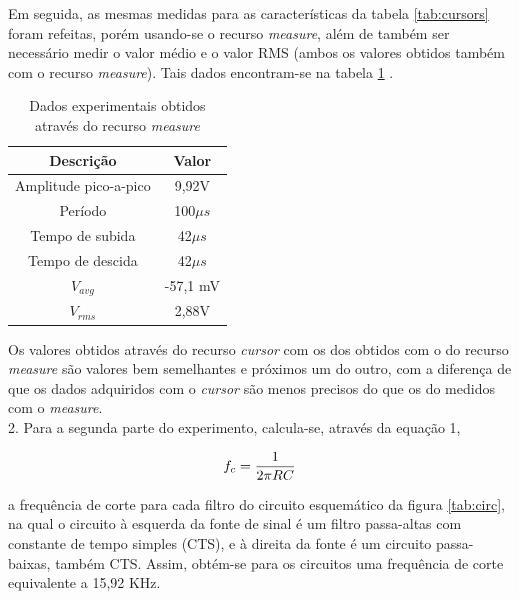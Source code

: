 \documentclass[a4paper]{article} %
\begin{document}
Em seguida, as mesmas medidas para as características da tabela \ref{tab:cursors} foram refeitas, porém usando-se o recurso \textit{measure}, além de também ser necessário medir o valor médio e o valor RMS (ambos os valores obtidos também com o recurso \textit{measure}). Tais dados encontram-se na tabela \ref{tab:measure} . 
\begin{table}[h]
\begin{centering}
\caption{Dados experimentais obtidos através do recurso \textit{measure} \label{tab:measure}}
\begin{tabular}{cc}
\hline 
Descrição & Valor\tabularnewline
\hline
Amplitude pico-a-pico & 9,92V \tabularnewline
Período & 100$\mu s$\tabularnewline
Tempo de subida & 42$\mu s$\tabularnewline
Tempo de descida  & 42$\mu s$\tabularnewline
$V_{avg}$ & -57,1 mV\tabularnewline
$V_{rms}$ & 2,88V \tabularnewline
\hline
\end{tabular}
\par\end{centering}
\end{table}
Os valores obtidos através do recurso \textit{cursor} com os dos obtidos com o do recurso \textit{measure} são valores bem semelhantes e próximos um do outro, com a diferença de que os dados adquiridos com o \textit{cursor}  são menos precisos do que os do medidos com o \textit{measure}.\\


2. Para a segunda parte do experimento, calcula-se, através da equação 1,
\vspace{1mm}

\begin{equation}
 f_{c}=\frac{1}{2\pi RC}\\
\end{equation}

\vspace{2mm}


 a frequência de corte para cada filtro do circuito esquemático da figura \ref{tab:circ}, na qual o circuito à esquerda da fonte de sinal é um filtro passa-altas com constante de tempo simples (CTS), e à direita da fonte é um circuito passa-baixas, também CTS. Assim, obtém-se para os circuitos uma frequência de corte equivalente a 15,92 KHz.
\end{document}

